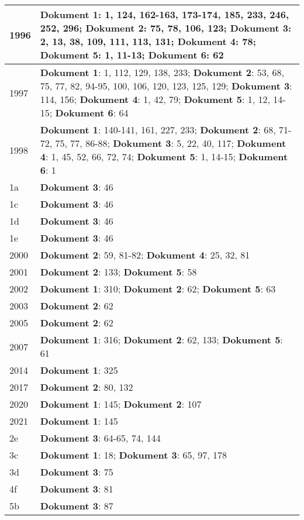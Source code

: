 \documentclass[a5paper]{article}
\begin{document}
\begin{longtable}[l]{|l|p{3in}|}
\hline
1996 & \textbf{Dokument 1}: 1, 124, 162-163, 173-174, 185, 233, 246, 252, 296; \textbf{Dokument 2}: 75, 78, 106, 123; \textbf{Dokument 3}: 2, 13, 38, 109, 111, 113, 131; \textbf{Dokument 4}: 78; \textbf{Dokument 5}: 1, 11-13; \textbf{Dokument 6}: 62 \\
\hline
1997 & \textbf{Dokument 1}: 1, 112, 129, 138, 233; \textbf{Dokument 2}: 53, 68, 75, 77, 82, 94-95, 100, 106, 120, 123, 125, 129; \textbf{Dokument 3}: 114, 156; \textbf{Dokument 4}: 1, 42, 79; \textbf{Dokument 5}: 1, 12, 14-15; \textbf{Dokument 6}: 64 \\
\hline
1998 & \textbf{Dokument 1}: 140-141, 161, 227, 233; \textbf{Dokument 2}: 68, 71-72, 75, 77, 86-88; \textbf{Dokument 3}: 5, 22, 40, 117; \textbf{Dokument 4}: 1, 45, 52, 66, 72, 74; \textbf{Dokument 5}: 1, 14-15; \textbf{Dokument 6}: 1 \\
\hline
1a & \textbf{Dokument 3}: 46 \\
\hline
1c & \textbf{Dokument 3}: 46 \\
\hline
1d & \textbf{Dokument 3}: 46 \\
\hline
1e & \textbf{Dokument 3}: 46 \\
\hline
2000 & \textbf{Dokument 2}: 59, 81-82; \textbf{Dokument 4}: 25, 32, 81 \\
\hline
2001 & \textbf{Dokument 2}: 133; \textbf{Dokument 5}: 58 \\
\hline
2002 & \textbf{Dokument 1}: 310; \textbf{Dokument 2}: 62; \textbf{Dokument 5}: 63 \\
\hline
2003 & \textbf{Dokument 2}: 62 \\
\hline
2005 & \textbf{Dokument 2}: 62 \\
\hline
2007 & \textbf{Dokument 1}: 316; \textbf{Dokument 2}: 62, 133; \textbf{Dokument 5}: 61 \\
\hline
2014 & \textbf{Dokument 1}: 325 \\
\hline
2017 & \textbf{Dokument 2}: 80, 132 \\
\hline
2020 & \textbf{Dokument 1}: 145; \textbf{Dokument 2}: 107 \\
\hline
2021 & \textbf{Dokument 1}: 145 \\
\hline
2e & \textbf{Dokument 3}: 64-65, 74, 144 \\
\hline
3c & \textbf{Dokument 1}: 18; \textbf{Dokument 3}: 65, 97, 178 \\
\hline
3d & \textbf{Dokument 3}: 75 \\
\hline
4f & \textbf{Dokument 3}: 81 \\
\hline
5b & \textbf{Dokument 3}: 87 \\

\end{longtable}
\end{document}

